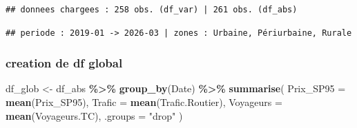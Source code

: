 \documentclass[
]{article}
\newenvironment{Shaded}{\begin{snugshade}}{\end{snugshade}}
\newcommand{\AttributeTok}[1]{\textcolor[rgb]{0.13,0.29,0.53}{#1}}
\newcommand{\FunctionTok}[1]{\textcolor[rgb]{0.13,0.29,0.53}{\textbf{#1}}}
\newcommand{\NormalTok}[1]{#1}
\newcommand{\OtherTok}[1]{\textcolor[rgb]{0.56,0.35,0.01}{#1}}
\newcommand{\SpecialCharTok}[1]{\textcolor[rgb]{0.81,0.36,0.00}{\textbf{#1}}}
\newcommand{\StringTok}[1]{\textcolor[rgb]{0.31,0.60,0.02}{#1}}
\begin{document}
\begin{verbatim}
## donnees chargees : 258 obs. (df_var) | 261 obs. (df_abs)
\end{verbatim}

\begin{Shaded}
\end{Shaded}

\begin{verbatim}
## periode : 2019-01 -> 2026-03 | zones : Urbaine, Périurbaine, Rurale
\end{verbatim}

\subsubsection{creation de df global}\label{creation-de-df-global}

\begin{Shaded}
\begin{Highlighting}[]
\NormalTok{df\_glob }\OtherTok{\textless{}{-}}\NormalTok{ df\_abs }\SpecialCharTok{\%\textgreater{}\%}
  \FunctionTok{group\_by}\NormalTok{(Date) }\SpecialCharTok{\%\textgreater{}\%}
  \FunctionTok{summarise}\NormalTok{(}
    \AttributeTok{Prix\_SP95 =} \FunctionTok{mean}\NormalTok{(Prix\_SP95),}
    \AttributeTok{Trafic    =} \FunctionTok{mean}\NormalTok{(Trafic.Routier),}
    \AttributeTok{Voyageurs =} \FunctionTok{mean}\NormalTok{(Voyageurs.TC),}
    \AttributeTok{.groups   =} \StringTok{"drop"}
\NormalTok{  )}
\end{Highlighting}
\end{Shaded}
\end{document}
